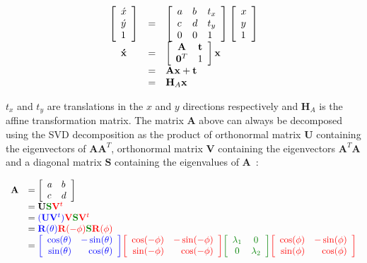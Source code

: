 \begin{equation}
\begin{array}{cllll}
\left[\begin{array}{l}\acute{x}\\\acute{y}\\1\end{array}\right]   &=& \left[ \begin{array}{lll} a &b & t_x \\ c & d & t_y \\ 0 & 0 & 1 \\ \end{array} \right] \left[\begin{array}{l}x\\y\\1\end{array}\right]\\
\mathbf{\acute{x}} &=& \left[\begin{array}{cccc}\mathbf{A} & \mathbf{t}\\\mathbf{0}^T & 1\end{array}\right] \mathbf{x}\\
&=& \mathbf{A}\mathbf{x} + \mathbf{t}\\
&=& \mathbf{H}_A \mathbf{x}\\
\end{array}
\end{equation}

$t_x$ and $t_y$ are translations in the $x$ and $y$ directions respectively and $\mathbf{H}_A$ is the affine transformation matrix.  The matrix $\mathbf{A}$ above can always be decomposed using the SVD decomposition as the product of orthonormal matrix $\mathbf{U}$ containing the eigenvectors of $\mathbf{A}\mathbf{A}^T$, orthonormal matrix $\mathbf{V}$ containing the eigenvectors  $\mathbf{A}^T\mathbf{A}$ and a diagonal matrix $\mathbf{S}$ containing the eigenvalues of $\mathbf{A}$~\cite{2004_BOOK_CG_Hartley}:

\begin{equation}
\begin{array}{llllllll}
\mathbf{A} &= \left[\begin{array}{lll}a & b \\ c & d\\ \end{array}\right] \\
&=\mathbf{U}{\color{darkgreen}\mathbf{S}}{\color{red}\mathbf{V}^t} \\
&={\color{blue}(\mathbf{U}\mathbf{V}^t)}{\color{red}\mathbf{V}}{\color{darkgreen}\mathbf{S}}{\color{red}\mathbf{V}^t}\\
&={\color{blue}\mathbf{R}(\theta)}{\color{red}\mathbf{R}(-\phi)}{\color{darkgreen}\mathbf{S}}{\color{red}\mathbf{R} (\phi)}\\
&={\color{blue}\RotMatrixTheta}{\color{red}\RotMatrixminusPhi}{\color{darkgreen}\EigenvalueMatrix}{\color{red}\RotMatrixPhi}\\\\
\end{array}
\label{Eq:AffineDecomposition}
\end{equation}

